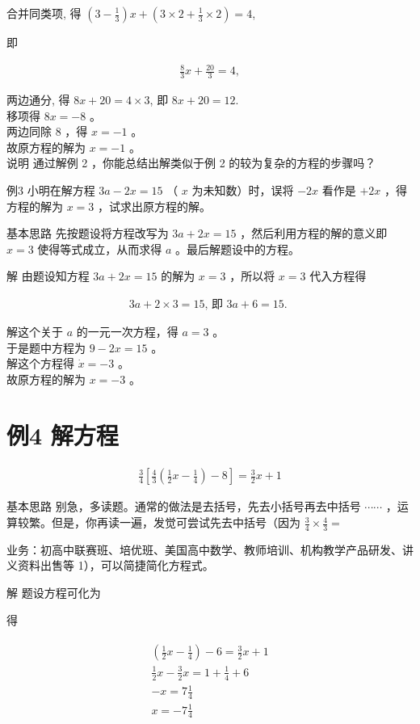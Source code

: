 \documentclass[10pt]{article}
\begin{document}
合并同类项, 得 $\left(3-\frac{1}{3}\right) x+\left(3 \times 2+\frac{1}{3} \times 2\right)=4$,

即

\begin{align*}
\frac{8}{3} x+\frac{20}{3}=4,
\end{align*}

两边通分, 得 $8 x+20=4 \times 3$, 即 $8 x+20=12$.\\
移项得 $8 x=-8$ 。\\
两边同除 8 ，得 $x=-1$ 。\\
故原方程的解为 $x=-1$ 。\\
说明 通过解例 2 ，你能总结出解类似于例 2 的较为复杂的方程的步骤吗？

例3 小明在解方程 $3 a-2 x=15$ （ $x$ 为未知数）时，误将 $-2 x$ 看作是 $+2 x$ ，得方程的解为 $x=3$ ，试求出原方程的解。

基本思路 先按题设将方程改写为 $3 a+2 x=15$ ，然后利用方程的解的意义即 $x=3$ 使得等式成立，从而求得 $a$ 。最后解题设中的方程。

解 由题设知方程 $3 a+2 x=15$ 的解为 $x=3$ ，所以将 $x=3$ 代入方程得

\begin{align*}
3 a+2 \times 3=15 \text {, 即 } 3 a+6=15 \text {. }
\end{align*}

解这个关于 $a$ 的一元一次方程，得 $a=3$ 。\\
于是题中方程为 $9-2 x=15$ 。\\
解这个方程得 $\dot{x}=-3$ 。\\
故原方程的解为 $x=-3$ 。

\section*{例4 解方程}
\begin{align*}
\frac{3}{4}\left[\frac{4}{3}\left(\frac{1}{2} x-\frac{1}{4}\right)-8\right]=\frac{3}{2} x+1
\end{align*}

基本思路 别急，多读题。通常的做法是去括号，先去小括号再去中括号 $\cdots \cdots$ ，运算较繁。但是，你再读一遍，发觉可尝试先去中括号（因为 $\frac{3}{4} \times \frac{4}{3}=$

业务：初高中联赛班、培优班、美国高中数学、教师培训、机构教学产品研发、讲义资料出售等 1），可以简捷简化方程式。

解 题设方程可化为

得

\begin{align*}
\begin{gathered}
\left(\frac{1}{2} x-\frac{1}{4}\right)-6=\frac{3}{2} x+1 \\
\frac{1}{2} x-\frac{3}{2} x=1+\frac{1}{4}+6 \\
-x=7 \frac{1}{4} \\
x=-7 \frac{1}{4}
\end{gathered}
\end{align*}
\end{document}
